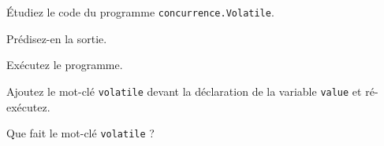 \documentclass{td}
\begin{document}

\begin{exercice}

  Étudiez le code du programme \texttt{concurrence.Volatile}.

  \begin{question}
  \item Prédisez-en la sortie.
  \item Exécutez le programme.
  \item Ajoutez le mot-clé \texttt{volatile} devant
    la déclaration de la variable \lstinline{value} et ré-exécutez.
  \item Que fait le mot-clé \texttt{volatile} ?
  \end{question}

\end{exercice}
\end{document}
